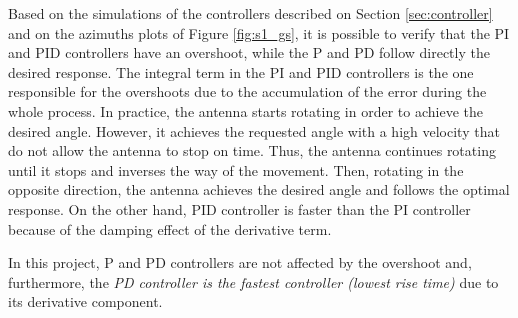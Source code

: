 Based on the simulations of the controllers described on Section \ref{sec:controller} and on the azimuths plots of Figure \ref{fig:s1_gs}, it is possible to verify that the PI and PID controllers have an overshoot, while the P and PD follow directly the desired response. The integral term in the PI and PID controllers is the one responsible for the overshoots due to the accumulation of the error during the whole process. In practice, the antenna starts rotating in order to achieve the desired angle. However, it achieves the requested angle with a high velocity that do not allow the antenna to stop on time. Thus, the antenna continues rotating until it stops and inverses the way of the movement. Then, rotating in the opposite direction, the antenna achieves the desired angle and follows the optimal response. On the other hand, PID controller is faster than the PI controller because of the damping effect of the derivative term.

In this project, P and PD controllers are not affected by the overshoot and, furthermore, the \emph{PD controller is the fastest controller (lowest rise time)} due to its derivative component.

